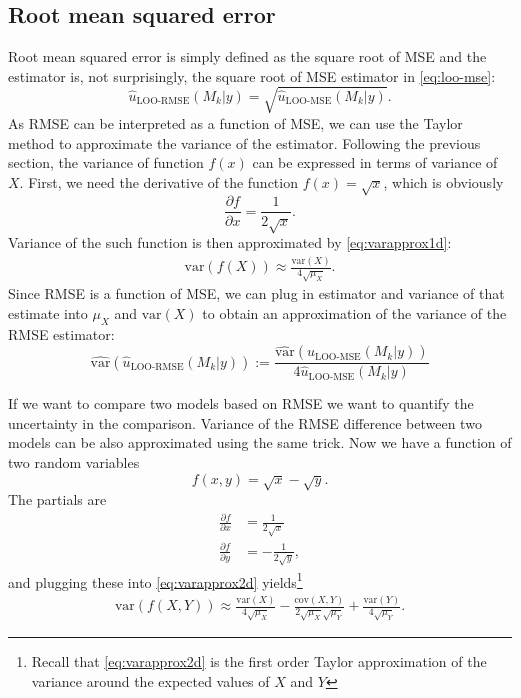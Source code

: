 \documentclass{article}
\begin{document}
\subsection{Root mean squared error}
Root mean squared error is simply defined as the square root of MSE and the estimator is, not surprisingly, the square root of MSE estimator in \eqref{eq:loo-mse}:
\begin{equation*}
    \hat{u}_{\text{LOO-RMSE}}(M_k|y) = \sqrt{\hat{u}_{\text{LOO-MSE}}(M_k|y)}.
\end{equation*}
As RMSE can be interpreted as a function of MSE, we can use the Taylor method to approximate the variance of the estimator. Following the previous section, the variance of function $f(x)$ can be expressed in terms of variance of $X$. First, we need the derivative of the function $f(x)= \sqrt{x}$, which is obviously
$$
\frac{\partial f}{\partial x} = \frac{1}{2 \sqrt{x}}.
$$
Variance of the such function is then approximated by \eqref{eq:varapprox1d}:
\begin{align*}
    \text{var}(f(X)) \approx \frac{\text{var}(X)}{4 \sqrt{\mu_X}}.
\end{align*}
Since RMSE is a function of MSE, we can plug in estimator and variance of that estimate into $\mu_X$ and $\text{var}(X)$ to obtain an approximation of the variance of the RMSE estimator:
\begin{equation}
    \widehat{\text{var}} \left( \hat{u}_{\text{LOO-RMSE}}(M_k|y) \right) :=  \frac{\widehat{\text{var}}\left( \hat{u}_{\text{LOO-MSE}}(M_k | y) \right)}{4 \hat{u}_{\text{LOO-MSE}}(M_k | y)} \label{eq:var-loo-rmse}
\end{equation}

If we want to compare two models based on RMSE we want to quantify the uncertainty in the comparison. Variance of the RMSE difference between two models can be also approximated using the same trick. Now we have a function of two random variables
$$
f(x,y) = \sqrt{x} - \sqrt{y}.
$$
The partials are
\begin{align*}
    \frac{\partial f}{\partial x} &= \frac{1}{2 \sqrt{x}} \\
    \frac{\partial f}{\partial y} &= -\frac{1}{2 \sqrt{y}},
\end{align*}
and plugging these into \eqref{eq:varapprox2d} yields\footnote{Recall that \eqref{eq:varapprox2d} is the first order Taylor approximation of the variance around the expected values of $X$ and $Y$}
\begin{align*}
    \text{var}\left(f(X,Y)\right) \approx \frac{\text{var}(X)}{4\sqrt{\mu_X}} - \frac{\text{cov}(X,Y)}{2 \sqrt{\mu_X} \sqrt{\mu_Y}} + \frac{\text{var}(Y)}{4\sqrt{\mu_Y}}.
\end{align*}
\end{document}
